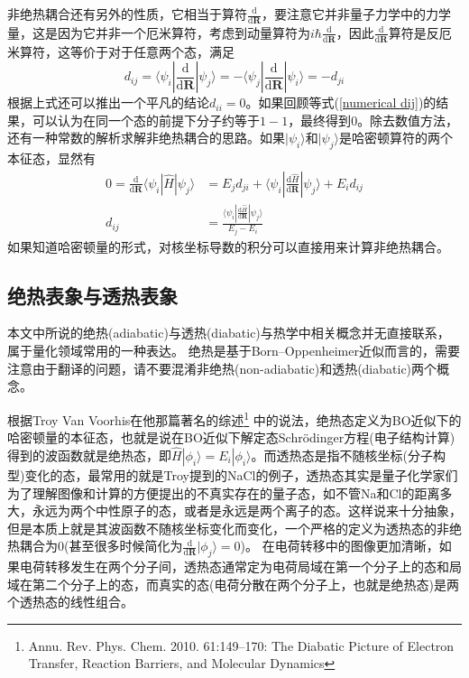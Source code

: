 \documentclass{article}
\numberwithin{equation}{section}
\begin{document}
        非绝热耦合还有另外的性质，它相当于算符$\frac{\mathrm{d}}{\mathrm{d}\mathbf{R}}$，要注意它并非量子力学中的力学量，这是因为它并非一个厄米算符，考虑到动量算符为$i\hbar\frac{\mathrm{d}}{\mathrm{d}\mathbf{R}}$，因此$\frac{\mathrm{d}}{\mathrm{d}\mathbf{R}}$算符是反厄米算符，这等价于对于任意两个态，满足
        \begin{equation}
          d_{ij}=\langle\psi_i|\frac{\mathrm{d}}{\mathrm{d}\mathbf{R}}|\psi_j\rangle=-\langle\psi_j|\frac{\mathrm{d}}{\mathrm{d}\mathbf{R}}|\psi_i\rangle=-d_{ji}
          \label{dij=-dji}
        \end{equation}
        根据上式还可以推出一个平凡的结论$d_{ii}=0$。如果回顾等式(\ref{numerical dij})的结果，可以认为在同一个态的前提下分子约等于$1-1$，最终得到$0$。除去数值方法，还有一种常数的解析求解非绝热耦合的思路。如果$|\psi_i\rangle$和$|\psi_j\rangle$是哈密顿算符的两个本征态，显然有
        \begin{equation}
          \begin{aligned}
            0=\frac{\mathrm{d}}{\mathrm{d}\mathbf{R}}\langle\psi_i|\hat{H}|\psi_j\rangle&=E_j d_{ji}+\langle\psi_i|\frac{\mathrm{d}\hat{H}}{\mathrm{d}\mathbf{R}}|\psi_j\rangle+E_i d_{ij}\\
            d_{ij}&=\frac{\langle\psi_i|\frac{\mathrm{d}\hat{H}}{\mathrm{d}\mathbf{R}}|\psi_j\rangle}{E_j-E_i}
          \end{aligned} 
          \label{analytical dij}
        \end{equation}
        如果知道哈密顿量的形式，对核坐标导数的积分可以直接用来计算非绝热耦合。
      \subsection{绝热表象与透热表象}
        本文中所说的绝热(adiabatic)与透热(diabatic)与热学中相关概念并无直接联系，属于量化领域常用的一种表达。
        绝热是基于Born–Oppenheimer近似而言的，需要注意由于翻译的问题，请不要混淆非绝热(non-adiabatic)和透热(diabatic)两个概念。

        根据Troy Van Voorhis在他那篇著名的综述\footnote{Annu. Rev. Phys. Chem. 2010. 61:149–170: The Diabatic Picture of Electron Transfer, Reaction Barriers, and Molecular Dynamics}
        中的说法，绝热态定义为BO近似下的哈密顿量的本征态，也就是说在BO近似下解定态Schr\"odinger方程(电子结构计算)得到的波函数就是绝热态，即$\hat{H}|\phi_i\rangle=E_i|\phi_i\rangle$。而透热态是指不随核坐标(分子构型)变化的态，最常用的就是Troy提到的NaCl的例子，透热态其实是量子化学家们为了理解图像和计算的方便提出的不真实存在的量子态，如不管Na和Cl的距离多大，永远为两个中性原子的态，或者是永远是两个离子的态。这样说来十分抽象，但是本质上就是其波函数不随核坐标变化而变化，一个严格的定义为透热态的非绝热耦合为0(甚至很多时候简化为$\frac{\mathrm{d}}{\mathrm{d}\mathbf{R}}|\phi_j\rangle=0$)。
        在电荷转移中的图像更加清晰，如果电荷转移发生在两个分子间，透热态通常定为电荷局域在第一个分子上的态和局域在第二个分子上的态，而真实的态(电荷分散在两个分子上，也就是绝热态)是两个透热态的线性组合。
\end{document}
